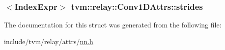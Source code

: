 \subsubsection[{\texorpdfstring{strides}{strides}}]{$<${\bf Index\+Expr}$>$ tvm\+::relay\+::\+Conv1\+D\+Attrs\+::strides}\hypertarget{structtvm_1_1relay_1_1Conv1DAttrs_a32d9295eefcc8153a1854cf2cf9f3486}{}\label{structtvm_1_1relay_1_1Conv1DAttrs_a32d9295eefcc8153a1854cf2cf9f3486}


The documentation for this struct was generated from the following file\+:\begin{DoxyCompactItemize}
\item 
include/tvm/relay/attrs/\hyperlink{include_2tvm_2relay_2attrs_2nn_8h}{nn.\+h}\end{DoxyCompactItemize}
